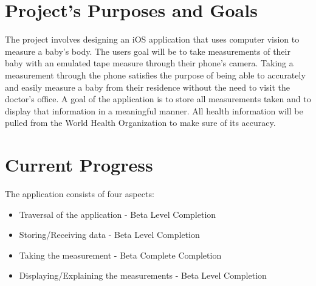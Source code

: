 \documentclass[onecolumn, draftclsnofoot,10pt, compsoc]{IEEEtran}
\begin{document}
\section{Project's Purposes and Goals}
The project involves designing an iOS application that uses computer vision to measure a baby's body. The users goal will be to take measurements of their baby with an emulated tape measure through their phone's camera. Taking a measurement through the phone satisfies the purpose of being able to accurately and easily measure a baby from their residence without the need to visit the doctor's office. A goal of the application is to store all measurements taken and to display that information in a meaningful manner. All health information will be pulled from the World Health Organization to make sure of its accuracy.


\section{Current Progress}
The application consists of four aspects:\par
\begin{itemize}
    \item Traversal of the application - Beta Level Completion
    \vspace{2}
    \item Storing/Receiving data - Beta Level Completion
    \vspace{2}
    \item Taking the measurement - Beta Complete Completion
    \vspace{2}
    \item Displaying/Explaining the measurements - Beta Level Completion\\
\end{itemize}
\end{document}
